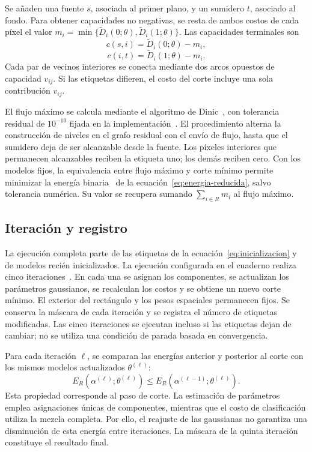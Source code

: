 Se añaden una fuente $s$, asociada al primer plano, y un sumidero $t$,
asociado al fondo. Para obtener capacidades no negativas, se resta de ambos
costos de cada píxel el valor
$m_i=\min\{\widetilde D_i(0;\theta),\widetilde D_i(1;\theta)\}$.
Las capacidades terminales son
\begin{equation}
 c(s,i)=\widetilde D_i(0;\theta)-m_i,
\end{equation}
\begin{equation}
 c(i,t)=\widetilde D_i(1;\theta)-m_i.
\end{equation}
Cada par de vecinos interiores se conecta mediante dos arcos opuestos de
capacidad $v_{ij}$. Si las etiquetas difieren, el costo del corte incluye
una sola contribución $v_{ij}$.

El flujo máximo se calcula mediante el algoritmo de Dinic~\cite{dinic1970},
con tolerancia
residual de $10^{-10}$ fijada en la implementación~\cite{cuaderno}. El procedimiento alterna la construcción de niveles
en el grafo residual con el envío de flujo, hasta que el sumidero deja de
ser alcanzable desde la fuente. Los píxeles interiores que permanecen
alcanzables reciben la etiqueta uno; los demás reciben cero. Con los
modelos fijos, la equivalencia entre flujo máximo y corte mínimo permite
minimizar la energía binaria~\cite{boykov2001,szeliski2011} de la
ecuación~\eqref{eq:energia-reducida}, salvo tolerancia numérica. Su valor se
recupera sumando $\sum_{i\in R}m_i$ al flujo máximo.

\subsection{Iteración y registro}

La ejecución completa parte de las etiquetas de la
ecuación~\eqref{eq:inicializacion} y de modelos recién inicializados.
La ejecución configurada en el cuaderno realiza cinco
iteraciones~\cite{cuaderno}. En cada una se asignan los componentes,
se actualizan los parámetros gaussianos, se recalculan los costos y se
obtiene un nuevo corte mínimo. El exterior del rectángulo y los pesos
espaciales permanecen fijos. Se conserva la máscara de cada iteración y se
registra el número de etiquetas modificadas. Las cinco iteraciones se
ejecutan incluso si las etiquetas dejan de cambiar; no se utiliza una
condición de parada basada en convergencia.

Para cada iteración $\ell$, se comparan las energías anterior y posterior
al corte con los mismos modelos actualizados $\theta^{(\ell)}$:
\begin{equation}
 E_R(\alpha^{(\ell)};\theta^{(\ell)})
 \leq E_R(\alpha^{(\ell-1)};\theta^{(\ell)}).
\end{equation}
Esta propiedad corresponde al paso de corte. La estimación de parámetros
emplea asignaciones únicas de componentes, mientras que el costo de
clasificación utiliza la mezcla completa. Por ello, el reajuste de las
gaussianas no garantiza una disminución de esta energía entre iteraciones.
La máscara de la quinta iteración constituye el resultado final.


